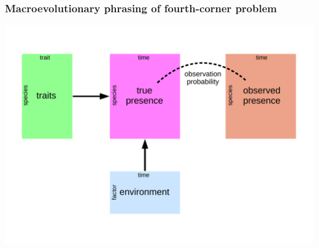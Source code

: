 \documentclass{beamer}
\begin{document}
\begin{frame}
  \frametitle{Macroevolutionary phrasing of fourth-corner problem}
  \begin{center}
    \includegraphics[width=\textwidth,height=0.8\textheight,keepaspectratio=true]{figure/paleo_fourth_corner}
  \end{center}
\end{frame}
\end{document}
